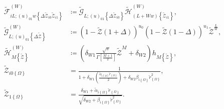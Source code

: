 \begin{align}
\tilde{\mathcal{F}}
_{
    iL;\left(u\right)_{01}w
    \left\{\Delta\tilde{\mathcal{Z}}_{i0}\tilde{\mathcal{Z}}_{i1}\right\}
}
^{\left(W\right)}
    &\coloneqq
        \tilde{\mathcal{G}}
        _{
            L;\left(u\right)_{01}
            \left\{\Delta\tilde{\mathcal{Z}}_{i0}\right\}
        }
        \tilde{\mathcal{H}}
        ^{\left(W\right)}
        _{
            \left(L+Ww\right)
            \left\{\tilde{\mathcal{Z}}_{i1}\right\}
        }
,\\
\tilde{\mathcal{G}}
_{L;\left(u\right)_{01}\left\{\Delta\tilde{\mathcal{Z}}\right\}}
^{\left(W\right)}
    &\coloneqq
        \left(1-\tilde{\mathcal{Z}}\left(1+\Delta\right)\right)^{u_{0}}
        \left(1-\tilde{\mathcal{Z}}\left(1-\Delta\right)\right)^{u_{1}}
        \tilde{\mathcal{Z}}^{\frac{L}{W}}
,\\
\tilde{\mathcal{H}}_{M\left\{\tilde{\mathcal{Z}}\right\}}^{\left(W\right)}
    &\coloneqq
        \left(
            \delta_{W1}
            \frac{\sqrt{\pi}}{\Gamma\left[\frac{M+1}{2}\right]}
            \tilde{\mathcal{Z}}^{M}
            +
            \delta_{W2}
        \right)
        h_{M\left\{\tilde{\mathcal{Z}}\right\}}
,\\
\tilde{\mathcal{Z}}_{i0\left\{\Omega\right\}}
    &=
        \frac
        {1}
        {
            1
                +
            \delta_{W1}
            \left(
                \frac
                { 
                    \tilde{\alpha}_{i\left\{\Omega\right\}}
                    \check{r}_{\left\{\Omega\right\}}
                }
                {2}
            \right)
                +
            \delta_{W2}
            \beta_{i\left\{\Omega\right\}}
            \check{r}_{\left\{\Omega\right\}}^{2}
        }
,\\
\tilde{\mathcal{Z}}_{1\left\{\Omega\right\}}
    &=
        \frac
        {
            \delta_{W1}
                +
            \tilde{\alpha}_{i\left\{\Omega\right\}}
            \check{r}_{\left\{\Omega\right\}}
        }
        {
            \sqrt{
                \delta_{W2}
                    +
                \beta_{i\left\{\Omega\right\}}
                \check{r}_{\left\{\Omega\right\}}^{2}
            }
        }    
.
\end{align}








